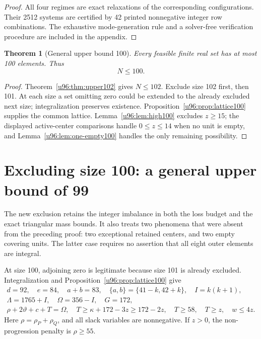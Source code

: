 \documentclass[11pt,a4paper]{article}
\newtheorem{theorem}{Theorem}[section]
\theoremstyle{remark}
\begin{document}
\begin{proof}
All four regimes are exact relaxations of the corresponding configurations.
Their 2512 systems are certified by 42 printed nonnegative integer row
combinations. The exhaustive mode-generation rule and a solver-free
verification procedure are included in the appendix.
\end{proof}

\begin{theorem}[General upper bound 100]\label{u96:thm:upper100}
Every feasible finite real set has at most 100 elements. Thus
\[
 \boxed{N\leq100}.
\]
\end{theorem}
\begin{proof}
Theorem~\ref{u96:thm:upper102} gives $N\leq102$. Exclude size 102 first, then 101.
At each size a set omitting zero could be extended to the already excluded
next size; integralization preserves existence. Proposition~\ref{u96:prop:lattice100}
supplies the common lattice. Lemma~\ref{u96:lem:high100} excludes $z\geq15$;
the displayed active-center comparisons handle $0\leq z\leq14$ when no
unit is empty, and Lemma~\ref{u96:lem:one-empty100} handles the only remaining
possibility. 
\end{proof}

\section{Excluding size 100: a general upper bound of 99}\label{u96:sec:upper99}
The new exclusion retains the integer imbalance in both the loss budget
and the exact triangular mass bounds. It also treats two phenomena that
were absent from the preceding proof: two exceptional retained centers,
and two empty covering units. The latter case requires no assertion that
all eight outer elements are integral.

At size 100, adjoining zero is legitimate because size 101 is already
excluded. Integralization and Proposition~\ref{u96:prop:lattice100} give
\begin{equation}
\begin{gathered}
 d=92,\quad e=84,\quad a+b=83,\quad
 \{a,b\}=\{41-k,42+k\},\quad I=k(k+1),\\
 \Lambda=1765+I,\quad \Omega=356-I,\quad G=172,\\
 \rho+2\vartheta+c+T=\Omega,\quad
 T\geq\kappa+172-3z\geq172-2z,\quad
 T\geq58,\quad T\geq z,\quad w\leq4z.
\end{gathered}\label{u96:eq:99-budget}
\end{equation}
Here $\rho=\rho_P+\rho_Q$, and all slack variables are nonnegative.
If $z>0$, the non-progression penalty is $\rho\geq55$.
\end{document}

